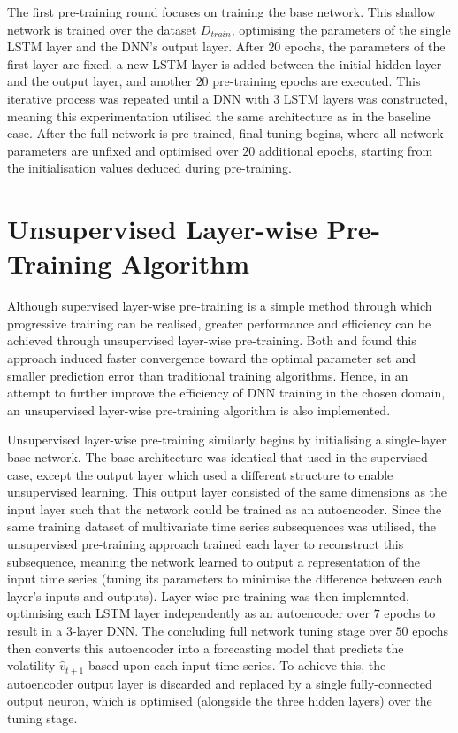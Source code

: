 \documentclass[a4paper, 11pt]{report}
\begin{document}
    The first pre-training round focuses on training the base network. This shallow network is trained over the dataset $D_{train}$, optimising the parameters of the single LSTM layer and the DNN's output layer. After $20$ epochs, the parameters of the first layer are fixed, a new LSTM layer is added between the initial hidden layer and the output layer, and another $20$ pre-training epochs are executed. This iterative process was repeated until a DNN with $3$ LSTM layers was constructed, meaning this experimentation utilised the same architecture as in the baseline case. After the full network is pre-trained, final tuning begins, where all network parameters are unfixed and optimised over $20$ additional epochs, starting from the initialisation values deduced during pre-training.


    \section{Unsupervised Layer-wise Pre-Training Algorithm}

    Although supervised layer-wise pre-training is a simple method through which progressive training can be realised, greater performance and efficiency can be achieved through unsupervised layer-wise pre-training. Both \citet{xu-2018} and \citet{sagheer-2019} found this approach induced faster convergence toward the optimal parameter set and smaller prediction error than traditional training algorithms. Hence, in an attempt to further improve the efficiency of DNN training in the chosen domain, an unsupervised layer-wise pre-training algorithm is also implemented.

    Unsupervised layer-wise pre-training similarly begins by initialising a single-layer base network. The base architecture was identical that used in the supervised case, except the output layer which used a different structure to enable unsupervised learning. This output layer consisted of the same dimensions as the input layer such that the network could be trained as an autoencoder. Since the same training dataset of multivariate time series subsequences was utilised, the unsupervised pre-training approach trained each layer to reconstruct this subsequence, meaning the network learned to output a representation of the input time series (tuning its parameters to minimise the difference between each layer's inputs and outputs). Layer-wise pre-training was then implemnted, optimising each LSTM layer independently as an autoencoder over $7$ epochs to result in a 3-layer DNN. The concluding full network tuning stage over $50$ epochs then converts this autoencoder into a forecasting model that predicts the volatility $\hat{v}_{t+1}$ based upon each input time series. To achieve this, the autoencoder output layer is discarded and replaced by a single fully-connected output neuron, which is optimised (alongside the three hidden layers) over the tuning stage.
\end{document}
